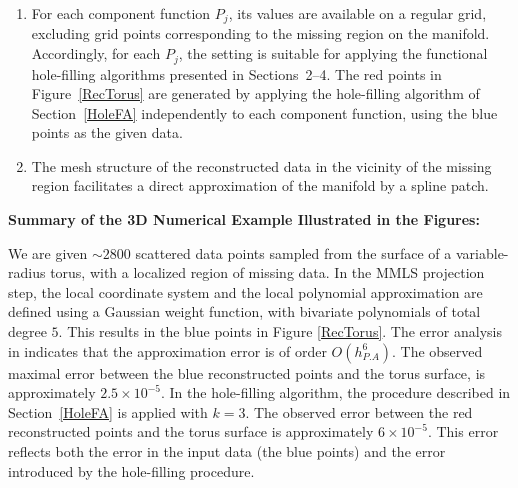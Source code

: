 \documentclass[11pt,oneside,reqno]{amsart}
\theoremstyle{plain}
\numberwithin{equation}{section}
\begin{document}
\begin{enumerate}
As seen in Figure~\ref{Torushole}, 
this assumption fails 
for grid points near the hole, 
where the available data are insufficient 
for a reliable projection. 
In regions of $R$ 
at a distance $> h_{P,A}$ from the hole, 
the MMLS projection yields 
a smooth, high-order approximation 
of the manifold. 
The resulting approximation is a $d$-dimensional vector of smooth functions,
$$\overline{\mathbf{P}}(x)=\big (P_1(x), P_2(x),...,P_d(x)\big).$$
In the torus example, 
for each admissible grid point $x_i$ 
on the reference plane, 
the projection yields a point 
$\big(P_1(x_i),P_2(x_i),P_3(x_i)\big)$ 
at a small distance 
from the torus.
The blue points in Figure~\ref{RecTorus} 
result from projecting 
points sampled on a fine mesh 
of the reference plane.
\item For each component function $P_j$, 
its values are available 
on a regular grid, 
excluding grid points 
corresponding to the missing region 
on the manifold. 
Accordingly, for each $P_j$, 
the setting is suitable 
for applying the functional 
hole-filling algorithms 
presented in Sections~2--4.
The red points in Figure~\ref{RecTorus} 
are generated by applying 
the hole-filling algorithm 
of Section~\ref{HoleFA} 
independently to each component function, 
using the blue points as the given data.
\item The mesh structure 
of the reconstructed data 
in the vicinity 
of the missing region 
facilitates a direct approximation 
of the manifold 
by a spline patch.
\end{enumerate}

\medskip
{\bf Summary of the 3D Numerical Example Illustrated in the Figures:}\hfill

\medskip
We are given $\sim 2800$ scattered data points sampled from the surface of a variable-radius torus, with a localized region of missing data. In the MMLS projection step, 
the local coordinate system 
and the local polynomial approximation 
are defined using a Gaussian weight function, 
with bivariate polynomials 
of total degree $5$. This results in the blue points in Figure \ref{RecTorus}. The error analysis in \cite{SoberLevin2016} indicates that the approximation error is of order $O(h_{P.A}^6)$. The observed maximal error 
between the blue reconstructed points 
and the torus surface, 
is approximately 
$2.5\times 10^{-5}$. In the hole-filling algorithm, the procedure described in Section~\ref{HoleFA} 
is applied with $k=3$. The observed error 
between the red reconstructed points 
and the torus surface 
is approximately 
$6\times 10^{-5}$. 
This error reflects 
both the error in the input data 
(the blue points) 
and the error introduced 
by the hole-filling procedure.
\end{document}
